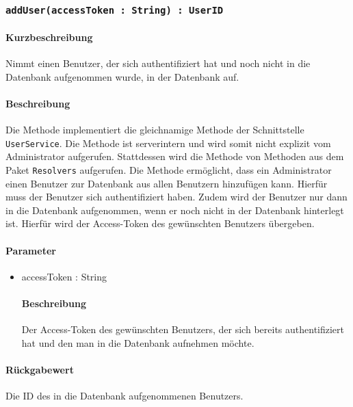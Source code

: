 \subsubsection{\texttt{addUser(accessToken : String) : UserID}}%
\paragraph*{Kurzbeschreibung}
Nimmt einen Benutzer, der sich authentifiziert hat und noch nicht in die Datenbank aufgenommen wurde, in der Datenbank auf.
\paragraph*{Beschreibung}
Die Methode implementiert die gleichnamige Methode der Schnittstelle \texttt{UserService}.
Die Methode ist serverintern und wird somit nicht explizit vom Administrator aufgerufen.
Stattdessen wird die Methode von Methoden aus dem Paket \texttt{Resolvers} aufgerufen.
Die Methode ermöglicht, dass ein Administrator einen Benutzer zur Datenbank aus allen Benutzern hinzufügen kann. Hierfür muss der Benutzer sich authentifiziert haben. 
Zudem wird der Benutzer nur dann in die Datenbank aufgenommen, wenn er noch nicht in der Datenbank hinterlegt ist.
Hierfür wird der Access-Token des gewünschten Benutzers übergeben.
\paragraph*{Parameter}
\begin{itemize}
    \item accessToken : String
    		\paragraph*{Beschreibung}
    		Der Access-Token des gewünschten Benutzers, der sich bereits authentifiziert hat und den man in die Datenbank aufnehmen möchte.
\end{itemize}
\paragraph*{Rückgabewert}
Die ID des in die Datenbank aufgenommenen Benutzers.

